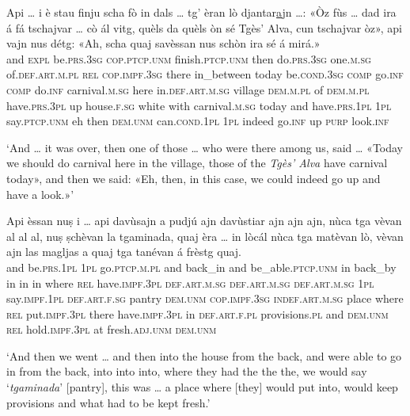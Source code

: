 \begin{linenumbers}
	\gll    Api … i è stau finju scha fò in dals … tg’ èran lò djantar\underline{a}jn …: «Òz fùs … dad ira á fá tschajvar … cò ál vitg, quèls da quèls òn sé Tgès’ Alva, cun tschajvar òz», api vajn nus détg: «Ah, scha quaj savèssan nus schòn ira sé á mirá.»\\
	and {} \textsc{expl} be.\textsc{prs.3sg} \textsc{cop.ptcp.unm} finish.\textsc{ptcp.unm} then do.\textsc{prs.3sg} one.\textsc{m.sg} of.\textsc{def.art.m.pl} {} \textsc{rel} \textsc{cop.impf.3sg} there in\_between {} today be.\textsc{cond.3sg} {} \textsc{comp} go.\textsc{inf} \textsc{comp} do.\textsc{inf} carnival.\textsc{m.sg} {} here in.\textsc{def.art.m.sg} village \textsc{dem.m.pl}  of \textsc{dem.m.pl} have.\textsc{prs.3pl} up house.\textsc{f.sg} white with carnival.\textsc{m.sg} today and have.\textsc{prs.1pl} \textsc{1pl} say.\textsc{ptcp.unm} eh then \textsc{dem.unm}  can.\textsc{cond.1pl} \textsc{1pl} indeed go.\textsc{inf} up \textsc{purp} look.\textsc{inf} \\
\end{linenumbers}
\medskip
\glt `And … it was over, then one of those … who were there among us, said … «Today we should do carnival here in the village, those of the \textit{Tgès' Alva} have carnival today», and then we said: «Eh, then, in this case, we could indeed go up and have a look.»'
\medskip

\begin{linenumbers}
	\gll    Api èssan nuṣ i … api davùsajn a pudjú ajn davùstiar ajn ajn ajn, nùca tga vèvan al al al, nuṣ ṣchèvan la tgaminada, quaj èra … in lòcál nùca tga matèvan lò, vèvan ajn las magljas a quaj tga tanévan á frèstg quaj.\\
	and be.\textsc{prs.1pl} \textsc{1pl} go.\textsc{ptcp.m.pl} {} and back\_in and be\_able.\textsc{ptcp.unm} in back\_by in in in where \textsc{rel} have.\textsc{impf.3pl} \textsc{def.art.m.sg} \textsc{def.art.m.sg} \textsc{def.art.m.sg} \textsc{1pl}  say.\textsc{impf.1pl} \textsc{def.art.f.sg} pantry \textsc{dem.unm} \textsc{cop.impf.3sg} {} \textsc{indef.art.m.sg} place where \textsc{rel} put.\textsc{impf.3pl} there have.\textsc{impf.3pl} in  \textsc{def.art.f.pl} provisions.\textsc{pl} and \textsc{dem.unm} \textsc{rel}  hold.\textsc{impf.3pl} at fresh.\textsc{adj.unm} \textsc{dem.unm}\\
\end{linenumbers}
\medskip
\glt `And then we went … and then into the house from the back, and were able to go in from the back, into into into, where they had the the the, we would say ‘\textit{tgaminada}’ [pantry], this was … a place where [they] would put into, would keep provisions and what had to be kept fresh.'
\medskip

